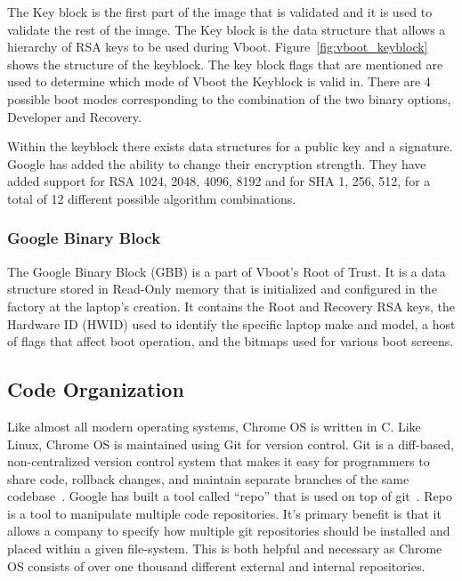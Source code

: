 \documentclass[../report.tex]{subfiles}
\begin{document}
The Key block is the first part of the image that is validated and it is used to validate the rest of the image.
The Key block is the data structure that allows a hierarchy of RSA keys to be used during Vboot.
Figure~\ref{fig:vboot_keyblock} shows the structure of the keyblock. 
The key block flags that are mentioned are used to determine which mode of Vboot the Keyblock is valid in. 
There are 4 possible boot modes corresponding to the combination of the two binary options, Developer and Recovery.

Within the keyblock there exists data structures for a public key and a signature.
Google has added the ability to change their encryption strength.
They have added support for RSA 1024, 2048, 4096, 8192 and for SHA 1, 256, 512, for a total of 12 different possible algorithm combinations.

\subsubsection{Google Binary Block}

The Google Binary Block (GBB) is a part of Vboot's Root of Trust.
It is a data structure stored in Read-Only memory that is initialized and configured in the factory at the laptop's creation.
It contains the Root and Recovery RSA keys, the Hardware ID (HWID) used to identify the specific laptop make and model, a host of flags that affect boot operation, and the bitmaps used for various boot screens.


\subsection{Code Organization}

Like almost all modern operating systems, Chrome OS is written in C.
Like Linux, Chrome OS is maintained using Git for version control. 
Git is a diff-based, non-centralized version control system that makes it easy for programmers to share code, rollback changes, and maintain separate branches of the same codebase~\cite{git}.
Google has built a tool called ``repo'' that is used on top of git~\cite{repo}. 
Repo is a tool to manipulate multiple code repositories. 
It's primary benefit is that it allows a company to specify how multiple git repositories should be installed and placed within a given file-system.
This is both helpful and necessary as Chrome OS consists of over one thousand different external and internal repositories. 
\end{document}
